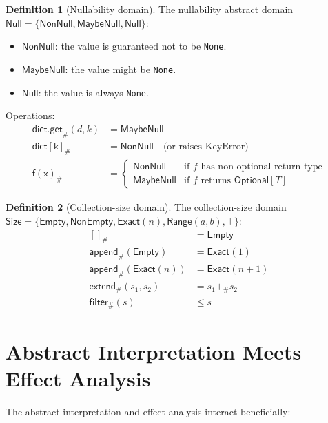 \documentclass[11pt,a4paper]{report}
\theoremstyle{definition}
\newtheorem{definition}{Definition}[chapter]
\theoremstyle{plain}
\begin{document}
\begin{definition}[Nullability domain]
The nullability abstract domain $\mathsf{Null} = \{\mathsf{NonNull}, \mathsf{MaybeNull}, \mathsf{Null}\}$:
\begin{itemize}
  \item $\mathsf{NonNull}$: the value is guaranteed not to be \lstinline[style=python]{None}.
  \item $\mathsf{MaybeNull}$: the value might be \lstinline[style=python]{None}.
  \item $\mathsf{Null}$: the value is always \lstinline[style=python]{None}.
\end{itemize}
Operations:
\begin{align}
  \mathsf{dict.get}_\#(d, k) &= \mathsf{MaybeNull} \\
  \mathsf{dict[k]}_\# &= \mathsf{NonNull} \quad \text{(or raises KeyError)} \\
  \mathsf{f(x)}_\# &= \begin{cases}
    \mathsf{NonNull} & \text{if } f \text{ has non-optional return type} \\
    \mathsf{MaybeNull} & \text{if } f \text{ returns } \mathsf{Optional}[T]
  \end{cases}
\end{align}
\end{definition}

\begin{definition}[Collection-size domain]
The collection-size domain $\mathsf{Size} = \{\mathsf{Empty}, \mathsf{NonEmpty}, \mathsf{Exact}(n), \mathsf{Range}(a, b), \top\}$:
\begin{align}
  \mathsf{[]}_\# &= \mathsf{Empty} \\
  \mathsf{append}_\#(\mathsf{Empty}) &= \mathsf{Exact}(1) \\
  \mathsf{append}_\#(\mathsf{Exact}(n)) &= \mathsf{Exact}(n+1) \\
  \mathsf{extend}_\#(s_1, s_2) &= s_1 +_\# s_2 \\
  \mathsf{filter}_\#(s) &\leq s
\end{align}
\end{definition}


\section{Abstract Interpretation Meets Effect Analysis}

The abstract interpretation and effect analysis interact beneficially:
\end{document}
